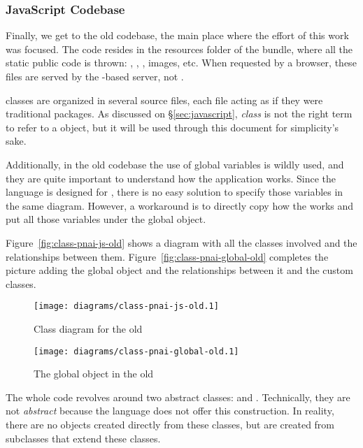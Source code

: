 \subsubsection{JavaScript Codebase} %
\label{ssub:jscodeold}

Finally, we get to the old  codebase, the main place where the effort of this work was focused.
The code resides in the resources folder of the  bundle, where all the static public code is thrown: , , , images, etc.
When requested by a browser, these files are served by the -based server, not .

 classes are organized in several source files, each file acting as if they were traditional packages.
As discussed on \S\vref{sec:javascript}, \emph{class} is not the right term to refer to a  object, but it will be used through this document for simplicity's sake.

Additionally, in the old codebase the use of global variables is wildly used, and they are quite important to understand how the application works.
Since the  language is designed for , there is no easy solution to specify those variables in the same diagram.
However, a workaround is to directly copy how the  works and put all those variables under the global  object.

Figure~\vref{fig:class-pnai-js-old} shows a diagram with all the classes involved and the relationships between them.
Figure~\vref{fig:class-pnai-global-old} completes the picture adding the global object and the relationships between it and the custom classes.

\begin{figure}[htbp]
  \centering
    \texttt{[image: diagrams/class-pnai-js-old.1]}
  \caption{Class diagram for the old }
  \label{fig:class-pnai-js-old}
\end{figure}

\begin{figure}[htbp]
  \centering
    \texttt{[image: diagrams/class-pnai-global-old.1]}
  \caption{The global  object in the old }
  \label{fig:class-pnai-global-old}
\end{figure}

The whole code revolves around two abstract classes:  and .
Technically, they are not \emph{abstract} because the  language does not offer this construction.
In reality, there are no objects created directly from these classes, but are created from subclasses that extend these classes.

